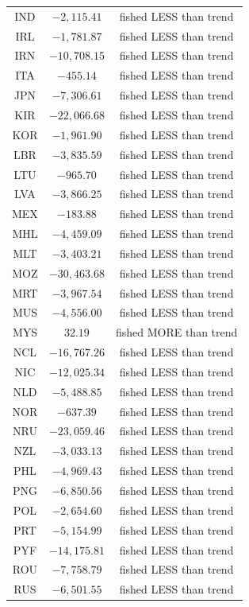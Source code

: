 \documentclass[
]{article}
\begin{document}
\begin{longtable}{ccc}
IND & $-2,115.41$ & fished LESS than trend \\ 
IRL & $-1,781.87$ & fished LESS than trend \\ 
IRN & $-10,708.15$ & fished LESS than trend \\ 
ITA & $-455.14$ & fished LESS than trend \\ 
JPN & $-7,306.61$ & fished LESS than trend \\ 
KIR & $-22,066.68$ & fished LESS than trend \\ 
KOR & $-1,961.90$ & fished LESS than trend \\ 
LBR & $-3,835.59$ & fished LESS than trend \\ 
LTU & $-965.70$ & fished LESS than trend \\ 
LVA & $-3,866.25$ & fished LESS than trend \\ 
MEX & $-183.88$ & fished LESS than trend \\ 
MHL & $-4,459.09$ & fished LESS than trend \\ 
MLT & $-3,403.21$ & fished LESS than trend \\ 
MOZ & $-30,463.68$ & fished LESS than trend \\ 
MRT & $-3,967.54$ & fished LESS than trend \\ 
MUS & $-4,556.00$ & fished LESS than trend \\ 
MYS & $32.19$ & fished MORE than trend \\ 
NCL & $-16,767.26$ & fished LESS than trend \\ 
NIC & $-12,025.34$ & fished LESS than trend \\ 
NLD & $-5,488.85$ & fished LESS than trend \\ 
NOR & $-637.39$ & fished LESS than trend \\ 
NRU & $-23,059.46$ & fished LESS than trend \\ 
NZL & $-3,033.13$ & fished LESS than trend \\ 
PHL & $-4,969.43$ & fished LESS than trend \\ 
PNG & $-6,850.56$ & fished LESS than trend \\ 
POL & $-2,654.60$ & fished LESS than trend \\ 
PRT & $-5,154.99$ & fished LESS than trend \\ 
PYF & $-14,175.81$ & fished LESS than trend \\ 
ROU & $-7,758.79$ & fished LESS than trend \\ 
RUS & $-6,501.55$ & fished LESS than trend \\ 

\end{longtable}
\end{document}

